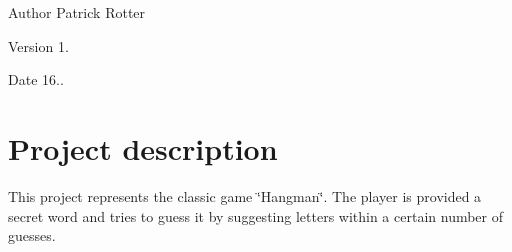 \begin{DoxyAuthor}{Author}
Patrick Rotter 
\end{DoxyAuthor}
\begin{DoxyVersion}{Version}
1. 
\end{DoxyVersion}
\begin{DoxyDate}{Date}
16..
\end{DoxyDate}
\hypertarget{index_description}{}\section{Project description}\label{index_description}
This project represents the classic game \char`\"{}\+Hangman\char`\"{}. The player is provided a secret word and tries to guess it by suggesting letters within a certain number of guesses. 